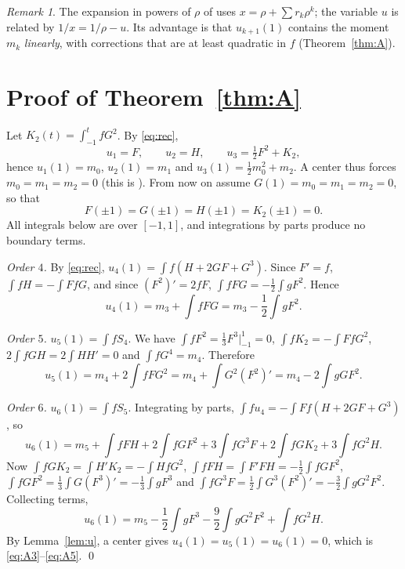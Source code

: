 \documentclass[11pt]{amsart}
\numberwithin{equation}{section}
\theoremstyle{plain}
\theoremstyle{definition}
\theoremstyle{remark}
\newtheorem{remark}[theorem]{Remark}
\begin{document}
\begin{remark}
The expansion in powers of $\rho$ of \cite{LY01,ALA20} uses $x=\rho+\sum r_k\rho^k$;
the variable $u$ is related by $1/x=1/\rho-u$. Its advantage is that
$u_{k+1}(1)$ contains the moment $m_k$ \emph{linearly}, with corrections that are
at least quadratic in $f$ (Theorem~\ref{thm:A}).
\end{remark}

\section{Proof of Theorem~\ref{thm:A}}\label{sec:A}

Let $K_2(t)=\int_{-1}^tfG^2$. By \eqref{eq:rec},
\[
 u_1=F,\qquad u_2=H,\qquad u_3=\tfrac12F^2+K_2,
\]
hence $u_1(1)=m_0$, $u_2(1)=m_1$ and $u_3(1)=\frac12m_0^2+m_2$. A center thus
forces $m_0=m_1=m_2=0$ (this is \cite[Thm.~1.7]{ALA20}). From now on assume
$G(1)=m_0=m_1=m_2=0$, so that
\[
 F(\pm1)=G(\pm1)=H(\pm1)=K_2(\pm1)=0 .
\]
All integrals below are over $[-1,1]$, and integrations by parts produce no
boundary terms.

\emph{Order $4$.} By \eqref{eq:rec}, $u_4(1)=\int f(H+2GF+G^3)$. Since $F'=f$,
$\int fH=-\int FfG$, and since $(F^2)'=2fF$, $\int fFG=-\frac12\int gF^2$. Hence
\begin{equation}\label{eq:u4}
 u_4(1)=m_3+\int fFG=m_3-\frac12\int gF^2.
\end{equation}

\emph{Order $5$.} $u_5(1)=\int fS_4$. We have $\int fF^2=\frac13F^3\big|_{-1}^1=0$,
$\int fK_2=-\int FfG^2$, $2\int fGH=2\int HH'=0$ and $\int fG^4=m_4$. Therefore
\begin{equation}\label{eq:u5}
 u_5(1)=m_4+2\int fFG^2=m_4+\int G^2(F^2)'=m_4-2\int gGF^2.
\end{equation}

\emph{Order $6$.} $u_6(1)=\int fS_5$. Integrating by parts,
$\int fu_4=-\int Ff(H+2GF+G^3)$, so
\[
 u_6(1)=m_5+\int fFH+2\int fGF^2+3\int fG^3F+2\int fGK_2+3\int fG^2H .
\]
Now $\int fGK_2=\int H'K_2=-\int HfG^2$, $\int fFH=\int F'FH=-\frac12\int fGF^2$,
$\int fGF^2=\frac13\int G(F^3)'=-\frac13\int gF^3$ and
$\int fG^3F=\frac12\int G^3(F^2)'=-\frac32\int gG^2F^2$. Collecting terms,
\begin{equation}\label{eq:u6}
 u_6(1)=m_5-\frac12\int gF^3-\frac92\int gG^2F^2+\int fG^2H .
\end{equation}
By Lemma~\ref{lem:u}, a center gives $u_4(1)=u_5(1)=u_6(1)=0$, which is
\eqref{eq:A3}--\eqref{eq:A5}. \qed
\end{document}
